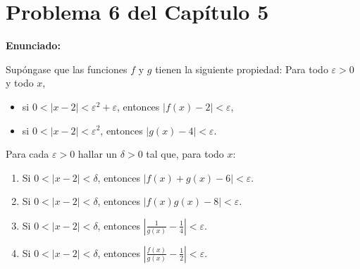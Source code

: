 \section*{Problema 6 del Capítulo 5}

\textbf{Enunciado:}

Supóngase que las funciones $f$ y $g$ tienen la siguiente propiedad: Para todo $\varepsilon > 0$ y todo $x$,
\begin{itemize}
    \item si $0 < |x - 2| < \varepsilon^2 + \varepsilon$, entonces $|f(x) - 2| < \varepsilon$,
    \item si $0 < |x - 2| < \varepsilon^2$, entonces $|g(x) - 4| < \varepsilon$.
\end{itemize}

Para cada $\varepsilon > 0$ hallar un $\delta > 0$ tal que, para todo $x$:
\begin{enumerate}
    \item Si $0 < |x - 2| < \delta$, entonces $|f(x) + g(x) - 6| < \varepsilon$.
    \item Si $0 < |x - 2| < \delta$, entonces $|f(x)g(x) - 8| < \varepsilon$.
    \item Si $0 < |x - 2| < \delta$, entonces $\left|\frac{1}{g(x)} - \frac{1}{4}\right| < \varepsilon$.
    \item Si $0 < |x - 2| < \delta$, entonces $\left|\frac{f(x)}{g(x)} - \frac{1}{2}\right| < \varepsilon$.
\end{enumerate}

